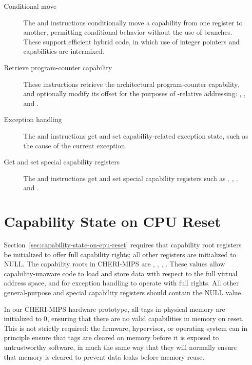 \begin{description}
\item[Conditional move]
The  and  instructions conditionally
move a capability from one register to another, permitting conditional
behavior without the use of branches.
These support efficient hybrid code, in which use of integer pointers and
capabilities are intermixed.

\item[Retrieve program-counter capability]
These instructions retrieve the architectural program-counter capability,
and optionally modify its offset for the purposes of \PCC{}-relative
addressing: , ,  and .

\item[Exception handling]
The  and  instructions get and
set capability-related exception state, such as the cause of the current
exception.

\item[Get and set special capability registers]
The  and  instructions get and set
special capability registers such as \DDC{}, \EPCC{}, \KDC{}, and \KCC{}.
\end{description}

\section{Capability State on CPU Reset}

Section~\ref{sec:capability-state-on-cpu-reset} requires that capability root
registers be initialized to offer full capability rights; all other registers
are initialized to NULL.
The capability roots in CHERI-MIPS are \PCC{}, \KCC{}, \EPCC{}, \ErrorEPCC{}.
These values allow capability-unaware code to load and store data with respect
to the full virtual address space, and for exception handling to operate with
full rights.
All other general-purpose and special capability registers should contain the
NULL value.

In our CHERI-MIPS hardware prototype, all tags in physical memory are
initialized to 0, ensuring that there are no valid capabilities in memory on
reset.
This is not strictly required: the firmware, hypervisor, or operating system
can in principle ensure that tags are cleared on memory before it is exposed
to untrustworthy software, in much the same way that they will normally ensure
that memory is cleared to prevent data leaks before memory reuse.

